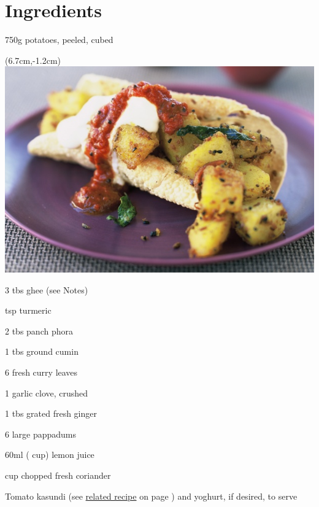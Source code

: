 

\bigskip
\section*{Ingredients}
\begin{ingredients-list}
	\item 750g potatoes, peeled, cubed
		\begin{textblock*}{8cm}(6.7cm,-1.2cm) %
			\includegraphics[scale=0.42]{./img/spicypotatoes.jpg}
		\end{textblock*}
	\item 3 tbs ghee (see Notes)
	\item {} tsp turmeric
	\item 2 tbs panch phora 
	\item 1 tbs ground cumin
	\item 6 fresh curry leaves
	\item 1 garlic clove, crushed
	\item 1 tbs grated fresh ginger
	\item 6 large pappadums
	\item 60ml ( cup) lemon juice
	\item {} cup chopped fresh coriander
	\item Tomato kasundi (see \hyperlink{tomato_kasundi}{related recipe} on page \pageref{tomato_kasundi} ) and yoghurt, if desired, to serve
\end{ingredients-list}

